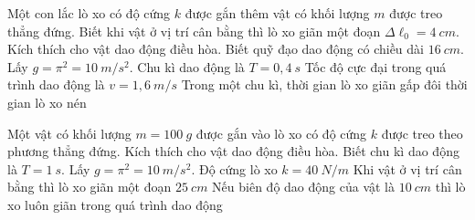 \begin{ex}
Một con lắc lò xo có độ cứng $k$ được gắn thêm vật có khối lượng $m$ được treo thẳng đứng. Biết khi vật ở vị trí cân bằng thì lò xo giãn một đoạn $\Delta \ell_0 =4\ cm$. Kích thích cho vật dao động điều hòa. Biết quỹ đạo dao động có chiều dài $16 \ cm$. Lấy $g=\pi^2=10 \ m/s^2$.
{\True Chu kì dao động là $T=0,4\ s$}
{Tốc độ cực đại trong quá trình dao động là $v=1,6\ m/s$}
{\True Trong một chu kì, thời gian lò xo giãn gấp đôi thời gian lò xo nén}
\end{ex} 
\begin{ex}
Một vật có khối lượng $m=100 \ g$ được gắn vào lò xo có độ cứng $k$ được treo theo phương thẳng đứng. Kích thích cho vật dao động điều hòa. Biết chu kì dao động là $T=1\ s$. Lấy $g=\pi^2=10 \ m/s^2$.
{Độ cứng lò xo $k=40\ N/m$}
{\True Khi vật ở vị trí cân bằng thì lò xo giãn một đoạn $25\ cm$}
{\True Nếu biên độ dao động của vật là $10 \ cm$ thì lò xo luôn giãn trong quá trình dao động}
\end{ex} 









